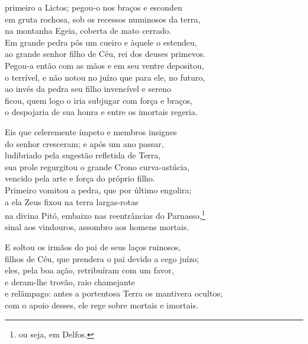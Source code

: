 primeiro a Lictos; pegou-o nos braços e escondeu\\
em gruta rochosa, sob os recessos numinosos da terra,\\
na montanha Egeia, coberta de mato cerrado.\\
Em grande pedra pôs um cueiro e àquele o estendeu, \\
ao grande senhor filho de Céu, rei dos deuses primevos.\\
Pegou-a então com as mãos e em seu ventre depositou,\\
o terrível, e não notou no juízo que para ele, no futuro,\\
ao invés da pedra seu filho invencível e sereno\\
ficou, quem logo o iria subjugar com força e braços, \\
o despojaria de sua honra e entre os imortais regeria.

\quad{}Eis que celeremente ímpeto e membros insignes\\
do senhor cresceram; e após um ano passar,\\
ludibriado pela sugestão refletida de Terra,\\
sua prole regurgitou o grande Crono curva-astúcia, \\
vencido pela arte e força do próprio filho.\\
Primeiro vomitou a pedra, que por último engolira;\\
a ela Zeus fixou na terra largas-rotas\\
na divina Pitó, embaixo nas reentrâncias do Parnasso,\footnote{ou seja, em Delfos.}\\
sinal aos vindouros, assombro aos homens mortais. 

\quad{}E soltou os irmãos do pai de seus laços ruinosos,\\
filhos de Céu, que prendera o pai devido a cego juízo;\\
eles, pela boa ação, retribuíram com um favor,\\
e deram-lhe trovão, raio chamejante\\
e relâmpago: antes a portentosa Terra os mantivera ocultos; \\
com o apoio desses, ele rege sobre mortais e imortais.

